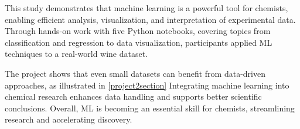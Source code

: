 This study demonstrates that machine learning is a powerful tool for chemists, enabling efficient analysis, visualization, and interpretation of experimental data. Through hands-on work with five Python notebooks, covering topics from classification and regression to data visualization, participants applied ML techniques to a real-world wine dataset.

The project shows that even small datasets can benefit from data-driven approaches, as illustrated in \cref{project2section} Integrating machine learning into chemical research enhances data handling and supports better scientific conclusions. Overall, ML is becoming an essential skill for chemists, streamlining research and accelerating discovery.\\

\noindent\dotfill
